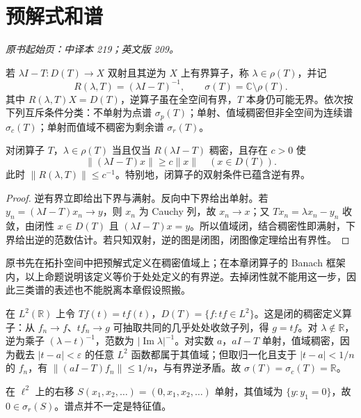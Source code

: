 \section{预解式和谱}\label{sec:yosida-08-01}
\noindent\textit{原书起始页：中译本 219；英文版 209。}

\begin{definition}[预解集与三类谱]
若 $\lambda I-T:D(T)\to X$ 双射且其逆为 $X$ 上有界算子，称 $\lambda\in\rho(T)$，并记
\[
 R(\lambda,T)=(\lambda I-T)^{-1},\qquad \sigma(T)=\mathbb C\setminus\rho(T).
\]
其中 $R(\lambda,T)X=D(T)$，逆算子虽在全空间有界，$T$ 本身仍可能无界。依次按下列互斥条件分类：不单射为点谱 $\sigma_p(T)$；单射、值域稠密但非全空间为连续谱 $\sigma_c(T)$；单射而值域不稠密为剩余谱 $\sigma_r(T)$。
\end{definition}

\begin{proposition}[闭性与稳定可解性]\label{prop:y8-lower-bound}
对闭算子 $T$，$\lambda\in\rho(T)$ 当且仅当 $R(\lambda I-T)$ 稠密，且存在 $c>0$ 使
\begin{equation}\label{eq:y8-lower-bound}
 \|(\lambda I-T)x\|\ge c\|x\|\quad(x\in D(T)).
\end{equation}
此时 $\|R(\lambda,T)\|\le c^{-1}$。特别地，闭算子的双射条件已蕴含逆有界。
\end{proposition}
\begin{proof}
逆有界立即给出下界与满射。反向中下界给出单射。若 $y_n=(\lambda I-T)x_n\to y$，则 $x_n$ 为 Cauchy 列，故 $x_n\to x$；又 $Tx_n=\lambda x_n-y_n$ 收敛，由闭性 $x\in D(T)$ 且 $(\lambda I-T)x=y$。所以值域闭，结合稠密性即满射，下界给出逆的范数估计。若只知双射，逆的图是闭图，闭图像定理给出有界性。
\end{proof}

原书先在拓扑空间中把预解式定义在稠密值域上；在本章闭算子的 Banach 框架内，以上命题说明该定义等价于处处定义的有界逆。去掉闭性就不能用这一步，因此三类谱的表述也不能脱离本章假设照搬。

\begin{example}[连续谱与剩余谱]
在 $L^2(\mathbb R)$ 上令 $Tf(t)=tf(t)$，$D(T)=\{f:tf\in L^2\}$。这是闭的稠密定义算子：从 $f_n\to f$、$tf_n\to g$ 可抽取共同的几乎处处收敛子列，得 $g=tf$。对 $\lambda\notin\mathbb R$，逆为乘子 $(\lambda-t)^{-1}$，范数为 $|\operatorname{Im}\lambda|^{-1}$。对实数 $a$，$aI-T$ 单射，值域稠密，因为截去 $|t-a|<\varepsilon$ 的任意 $L^2$ 函数都属于其值域；但取归一化且支于 $|t-a|<1/n$ 的 $f_n$，有 $\|(aI-T)f_n\|\le1/n$，与有界逆矛盾。故 $\sigma(T)=\sigma_c(T)=\mathbb R$。

在 $\ell^2$ 上的右移 $S(x_1,x_2,\ldots)=(0,x_1,x_2,\ldots)$ 单射，其值域为 $\{y:y_1=0\}$，故 $0\in\sigma_r(S)$。谱点并不一定是特征值。
\end{example}


